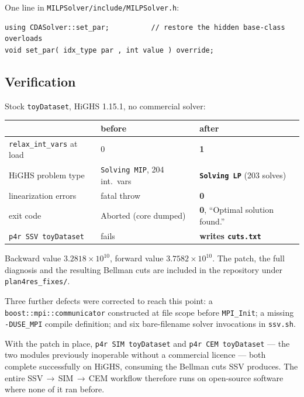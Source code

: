 \documentclass[12pt,a4paper]{article}
\begin{document}
One line in \texttt{MILPSolver/include/MILPSolver.h}:

\begin{lstlisting}
using CDASolver::set_par;          // restore the hidden base-class overloads
void set_par( idx_type par , int value ) override;
\end{lstlisting}

\subsection{Verification}

Stock \texttt{toyDataset}, HiGHS 1.15.1, no commercial solver:

\begin{center}
\begin{tabular}{lll}
\toprule
& \textbf{before} & \textbf{after} \\
\midrule
\texttt{relax\_int\_vars} at load & 0 & \textbf{1} \\
HiGHS problem type & \texttt{Solving MIP}, 204 int.\ vars & \textbf{\texttt{Solving LP}} (203 solves) \\
linearization errors & fatal throw & \textbf{0} \\
exit code & Aborted (core dumped) & \textbf{0}, ``Optimal solution found.'' \\
\texttt{p4r SSV toyDataset} & fails & \textbf{writes \texttt{cuts.txt}} \\
\bottomrule
\end{tabular}
\end{center}

Backward value $3.2818\times10^{10}$, forward value $3.7582\times10^{10}$.
The patch, the full diagnosis and the resulting Bellman cuts are included in the
repository under \texttt{plan4res\_fixes/}.

Three further defects were corrected to reach this point: a
\texttt{boost::mpi::communicator} constructed at file scope before
\texttt{MPI\_Init}; a missing \texttt{-DUSE\_MPI} compile definition; and six
bare-filename solver invocations in \texttt{ssv.sh}.

With the patch in place, \texttt{p4r SIM toyDataset} and \texttt{p4r CEM
toyDataset} --- the two modules previously inoperable without a commercial
licence --- both complete successfully on HiGHS, consuming the Bellman cuts
SSV produces. The entire SSV\,$\rightarrow$\,SIM\,$\rightarrow$\,CEM workflow
therefore runs on open-source software where none of it ran before.
\end{document}
